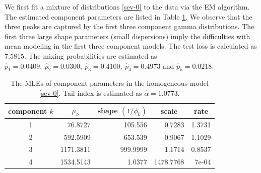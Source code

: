 \documentclass[11pt]{article}
\numberwithin{equation}{section}
\begin{document}
We first fit a mixture of distributions \eqref{sev-0} to the data via the EM algorithm. 
The estimated component parameters are listed in Table \ref{null-gamma}. We observe that the three peaks are captured by the first three component gamma distributions.
	The first three large shape parameters (small dispersions) imply the  difficulties with {mean modeling} in the first three component models.
	 The test loss is calculated as 7.5815. The mixing probabilities are estimated as $\hat{p}_1=0.0409,~ \hat{p}_2=0.0300, ~\hat{p}_3=0.4100,~ \hat{p}_4=0.4973$ and $\hat{p}_5=0.0218.$
\begin{table}[h!]
	\centering
	\caption{The MLEs of component parameters in the homogeneous model \eqref{sev-0}. Tail index is estimated as $\hat{\alpha}=1.0773$.}\label{null-gamma}
	\begin{tabular}{crrrr}
		\hline
		component $k$ & \multicolumn{1}{c}{$\mu_k$} & \multicolumn{1}{c}{shape $(1/\phi_k)$} & \multicolumn{1}{c}{scale} & \multicolumn{1}{c}{rate} \\ \hline
		1         & 76.8727                & 105.556                   & 0.7283                    & 1.3731                   \\
		2         & 592.5909               & 653.539                   & 0.9067                    & 1.1029                   \\
		3         & 1171.3811              & 999.9999                  & 1.1714                    & 0.8537                   \\
		4         & 1534.5143              & 1.0377                    & 1478.7768                 & 7e-04                    \\ \hline
	\end{tabular}
\end{table}
\end{document}
